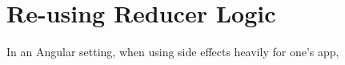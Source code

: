 \maketitle{}
\section{ Re-using Reducer Logic }

In an Angular setting, when using side effects heavily for one's app, 
